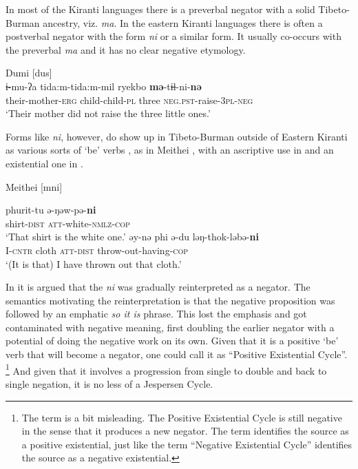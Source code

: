 ﻿\documentclass[output=paper,draft,draftmode,colorlinks,citecolor=brown]{langscibook}
\begin{document}
In most of the Kiranti languages there is a preverbal negator with a solid
Tibeto-Burman ancestry, viz. \textit{ma}. In the eastern Kiranti languages
there is often a postverbal negator with the form \textit{ni} or a similar
form. It usually co-occurs with the preverbal \textit{ma} and it has no
clear negative etymology.
%
\begin{exe}\ex\label{ex:int-dumi-mother}
Dumi [dus] \\
    \gll i̶-mu-ʔa  tida:m-tida:m-mil  ryekbo
    \textbf{mə}-ti̶̶l-ni-\textbf{nə} \\
      their-mother-\textsc{erg}  child-child-\textsc{pl}  three 
    \textsc{neg.pst}-raise-\textsc{3pl-neg} \\
    \glt `Their mother did not raise the three little ones.'
    \end{exe}
%
Forms like \textit{ni}, however, do show up in Tibeto-Burman outside of
Eastern Kiranti as various sorts of `be' verbs \parencite{Lowes2006}, as in
Meithei \parencite[249--250, 297]{Chelliah1997}, with an ascriptive use in
 and an existential one in
.

\begin{exe}\ex Meithei [mni]
\begin{xlist}
    \ex\label{ex:int-meithei-shirt}
    \gll phurit-tu  ə-ŋəw-pə-\textbf{ni} \\
    shirt-\textsc{dist}  \textsc{att}-white-\textsc{nmlz-cop}\\
    \glt `That shirt is the white one.'
    \ex\label{ex:int-meithei-cloth}
    \gll əy-nə    phi  ə-du    ləŋ-thok-ləbə-\textbf{ni}\\
I-\textsc{cntr}  cloth  \textsc{att-dist}  throw-out-having-\textsc{cop}\\
    \glt `(It is that) I have thrown out that cloth.'
    \end{xlist}\end{exe}
%
In \textcite{AuweraVossen2017} it is argued that the \textit{ni} was
gradually reinterpreted as a negator. The semantics motivating the
reinterpretation is that the negative proposition was followed by an
emphatic \textit{so it is} phrase. This lost the emphasis
and got contaminated with negative meaning, first doubling the earlier
negator with a potential of doing the negative work on its own. Given that
it is a positive `be' verb that will become a negator, one could call it as
``Positive Existential Cycle''.%
%
\footnote{The term is a bit misleading. The Positive Existential Cycle is
still negative in the sense that it produces a new negator. The term
identifies the source as a positive existential, just like the term
``Negative Existential Cycle'' identifies the source as a negative
existential.} %
%
And given that it involves a progression from single to double and back to
single negation, it is no less of a Jespersen Cycle.
\end{document}
